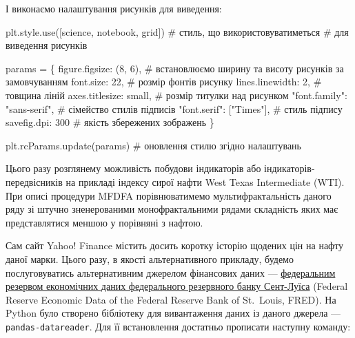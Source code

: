 \documentclass[
  letterpaper,
]{report}
\newenvironment{Shaded}{\begin{snugshade}}{\end{snugshade}}
\newcommand{\CommentTok}[1]{\textcolor[rgb]{0.37,0.37,0.37}{#1}}
\newcommand{\DecValTok}[1]{\textcolor[rgb]{0.68,0.00,0.00}{#1}}
\newcommand{\NormalTok}[1]{\textcolor[rgb]{0.00,0.23,0.31}{#1}}
\newcommand{\OperatorTok}[1]{\textcolor[rgb]{0.37,0.37,0.37}{#1}}
\newcommand{\StringTok}[1]{\textcolor[rgb]{0.13,0.47,0.30}{#1}}
\begin{document}
І виконаємо налаштування рисунків для виведення:

\begin{Shaded}
\begin{Highlighting}[]
\NormalTok{plt.style.use([}\StringTok{\textquotesingle{}science\textquotesingle{}}\NormalTok{, }\StringTok{\textquotesingle{}notebook\textquotesingle{}}\NormalTok{, }\StringTok{\textquotesingle{}grid\textquotesingle{}}\NormalTok{]) }\CommentTok{\# стиль, що використовуватиметься}
                                               \CommentTok{\# для виведення рисунків}

\NormalTok{params }\OperatorTok{=}\NormalTok{ \{}
    \StringTok{\textquotesingle{}figure.figsize\textquotesingle{}}\NormalTok{: (}\DecValTok{8}\NormalTok{, }\DecValTok{6}\NormalTok{),         }\CommentTok{\# встановлюємо ширину та висоту рисунків за замовчуванням}
    \StringTok{\textquotesingle{}font.size\textquotesingle{}}\NormalTok{: }\DecValTok{22}\NormalTok{,                  }\CommentTok{\# розмір фонтів рисунку}
    \StringTok{\textquotesingle{}lines.linewidth\textquotesingle{}}\NormalTok{: }\DecValTok{2}\NormalTok{,             }\CommentTok{\# товщина ліній}
    \StringTok{\textquotesingle{}axes.titlesize\textquotesingle{}}\NormalTok{: }\StringTok{\textquotesingle{}small\textquotesingle{}}\NormalTok{,        }\CommentTok{\# розмір титулки над рисунком}
    \StringTok{"font.family"}\NormalTok{: }\StringTok{"sans{-}serif"}\NormalTok{,      }\CommentTok{\# сімейство стилів підписів }
    \StringTok{"font.serif"}\NormalTok{: [}\StringTok{"Times"}\NormalTok{],          }\CommentTok{\# стиль підпису}
    \StringTok{\textquotesingle{}savefig.dpi\textquotesingle{}}\NormalTok{: }\DecValTok{300}                \CommentTok{\# якість збережених зображень}
\NormalTok{\}}

\NormalTok{plt.rcParams.update(params)           }\CommentTok{\# оновлення стилю згідно налаштувань}
\end{Highlighting}
\end{Shaded}

Цього разу розглянему можливість побудови індикаторів або
індикаторів-передвісників на прикладі індексу сирої нафти West Texas
Intermediate (WTI). При описі процедури MFDFA порівнюватимемо
мультифрактальність даного ряду зі штучно зненерованими монофрактальними
рядами складність яких має представлятися меншою у порівняні з нафтою.

Сам сайт Yahoo! Finance містить досить коротку історію щодених цін на
нафту даної марки. Цього разу, в якості альтернативного прикладу, будемо
послуговуватись альтернативним джерелом фінансових даних ---
\href{https://fred.stlouisfed.org}{федеральним резервом економічних
даних федерального резервного банку Сент-Луїса} (Federal Reserve
Economic Data of the Federal Reserve Bank of St.~Louis, FRED). На Python
було створено бібліотеку для вивантаження даних із даного джерела ---
\texttt{pandas-datareader}. Для її встановлення достатньо прописати
наступну команду:
\end{document}
